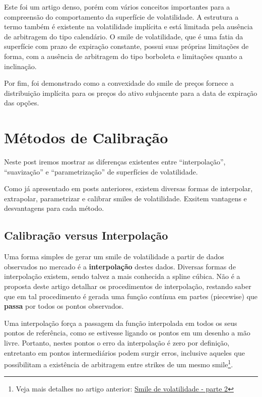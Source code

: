 \documentclass[]{book}
\let\rmarkdownfootnote\footnote%
\def\footnote{\protect\rmarkdownfootnote}
\begin{document}
Este foi um artigo denso, porém com vários conceitos importantes para a
compreensão do comportamento da superfície de volatilidade. A estrutura
a termo também é existente na volatilidade implícita e está limitada
pela ausência de arbitragem do tipo calendário. O smile de volatilidade,
que é uma fatia da superfície com prazo de expiração constante, possui
suas próprias limitações de forma, com a ausência de arbitragem do tipo
borboleta e limitações quanto a inclinação.

Por fim, foi demonstrado como a convexidade do smile de preços fornece a
distribuição implícita para os preços do ativo subjacente para a data de
expiração das opções.

\chapter{Métodos de Calibração}\label{calibracao}

Neste post iremos mostrar as diferenças existentes entre
``interpolação'', ``suavização'' e ``parametrização'' de superfícies de
volatilidade.

Como já apresentado em posts anteriores, existem diversas formas de
interpolar, extrapolar, parametrizar e calibrar smiles de volatilidade.
Exsitem vantagens e desvantagens para cada método.

\section{Calibração versus
Interpolação}\label{calibracao-versus-interpolacao}

Uma forma simples de gerar um smile de volatilidade a partir de dados
observados no mercado é a \textbf{interpolação} destes dados. Diversas
formas de interpolação existem, sendo talvez a mais conhecida a spline
cúbica. Não é a proposta deste artigo detalhar os procedimentos de
interpolação, restando saber que em tal procedimento é gerada uma função
contínua em partes (piecewise) que \textbf{passa} por todos os pontos
observados.

Uma interpolação força a passagem da função interpolada em todos os seus
pontos de referência, como se estivesse ligando os pontos em um desenho
a mão livre. Portanto, nestes pontos o erro da interpolação é zero por
definição, entretanto em pontos intermediários podem surgir erros,
inclusive aqueles que possibilitam a existência de arbitragem entre
strikes de um mesmo smile\footnote{Veja mais detalhes no artigo
  anterior: \href{/2019/01/25/smile-de-volatilidade-parte-2}{Smile de
  volatilidade - parte 2}}.
\end{document}
